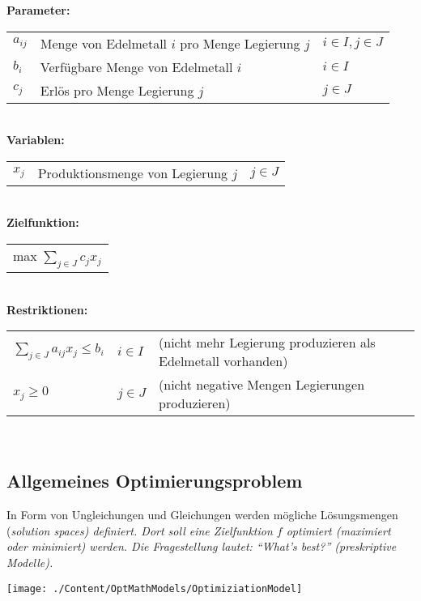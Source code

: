     \textbf{Parameter:}\\
    \begin{tabular}{lll}
      $a_{ij}$ & Menge von Edelmetall $i$ pro Menge Legierung $j$ & $i \in I, j \in J$\\
      $b_i$    & Verfügbare Menge von Edelmetall $i$              & $i \in I$\\
      $c_j$    & Erlös pro Menge Legierung $j$                    & $j \in J$\\
    \end{tabular}\\

    \textbf{Variablen:}\\
    \begin{tabular}{lll}
      $x_j$ & Produktionsmenge von Legierung $j$ & $j \in J$\\
    \end{tabular}\\

    \textbf{Zielfunktion:}\\
    \begin{tabular}{l}
      max $\sum\limits_{j \in J}c_j x_j$\\
    \end{tabular}\\

    \textbf{Restriktionen:}\\
    \begin{tabular}{lll}
      $\sum\limits_{j \in J}a_{ij}x_j \le b_i$ & $i \in I$ & (nicht mehr Legierung produzieren als Edelmetall vorhanden)\\
      $x_j \ge 0$                       & $j \in J$ & (nicht negative Mengen Legierungen produzieren)
    \end{tabular}\\




\subsection{Allgemeines Optimierungsproblem }
  In Form von Ungleichungen und Gleichungen werden mögliche Lösungsmengen (\em solution spaces\em) definiert. Dort soll eine Zielfunktion $f$ optimiert (maximiert oder minimiert) werden. Die Fragestellung lautet: "`What's best?"' (preskriptive Modelle).
  
  \begin{center}
    \texttt{[image: ./Content/OptMathModels/OptimiziationModel]}
  \end{center}
  
